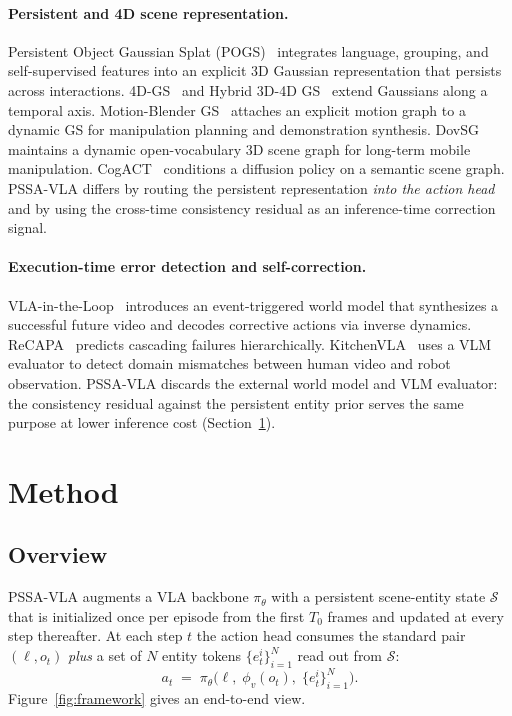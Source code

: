 \documentclass[10pt,letterpaper]{article}
\newcommand{\method}{\textsc{PSSA-VLA}\xspace}
\begin{document}
\paragraph{Persistent and 4D scene representation.}
Persistent Object Gaussian Splat (POGS)~\cite{pogs} integrates language,
grouping, and self-supervised features into an explicit 3D Gaussian
representation that persists across interactions. 4D-GS~\cite{fourdgs}
and Hybrid 3D-4D GS~\cite{hybridgs} extend Gaussians along a temporal
axis. Motion-Blender GS~\cite{motionblender} attaches an explicit motion
graph to a dynamic GS for manipulation planning and demonstration
synthesis. DovSG~\cite{dovsg} maintains a dynamic open-vocabulary 3D
scene graph for long-term mobile manipulation. CogACT~\cite{cogact}
conditions a diffusion policy on a semantic scene graph. \method differs
by routing the persistent representation \emph{into the action head} and
by using the cross-time consistency residual as an inference-time
correction signal.

\paragraph{Execution-time error detection and self-correction.}
VLA-in-the-Loop~\cite{vlaintheloop} introduces an event-triggered world
model that synthesizes a successful future video and decodes corrective
actions via inverse dynamics. ReCAPA~\cite{recapa} predicts cascading
failures hierarchically. KitchenVLA~\cite{kitchenvla} uses a VLM
evaluator to detect domain mismatches between human video and robot
observation. \method discards the external world model and VLM
evaluator: the consistency residual against the persistent entity prior
serves the same purpose at lower inference cost (Section~\ref{sec:method}).

\section{Method}\label{sec:method}

\subsection{Overview}

\method augments a VLA backbone $\pi_\theta$ with a persistent scene-entity
state $\mathcal{S}$ that is initialized once per episode from the first
$T_0$ frames and updated at every step thereafter. At each step $t$ the
action head consumes the standard pair $(\ell, o_t)$ \emph{plus} a set
of $N$ entity tokens $\{e^i_t\}_{i=1}^{N}$ read out from $\mathcal{S}$:
\begin{equation}
  a_t \;=\; \pi_\theta\!\bigl(\ell,\; \phi_v(o_t),\; \{e^i_t\}_{i=1}^{N}\bigr).
\end{equation}
Figure~\ref{fig:framework} gives an end-to-end view.
\end{document}
